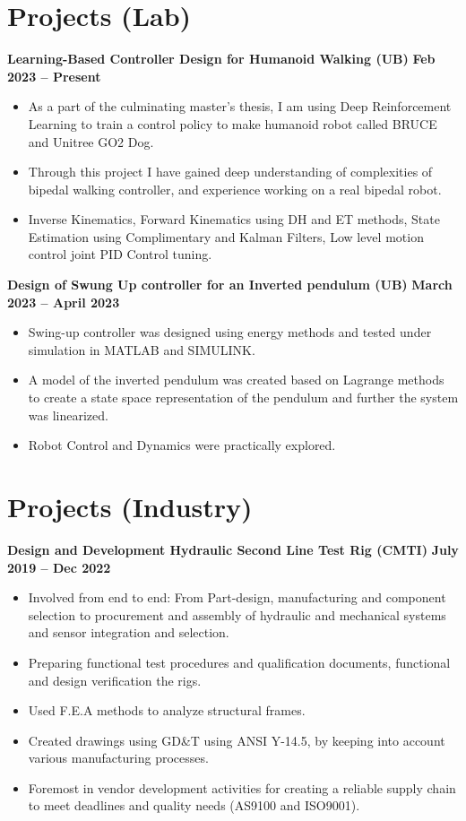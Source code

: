 \documentclass[10pt, letterpaper]{article}
\begin{document}
\section{Projects (Lab)}
\textbf{Learning-Based Controller Design for Humanoid Walking (UB) } \hfill \textbf{Feb 2023 – Present}\\
\begin{itemize}
    \item As a part of the culminating master’s thesis, I am using Deep Reinforcement Learning to train a control policy to make humanoid robot called BRUCE and Unitree GO2 Dog.
    \item Through this project I have gained deep understanding of complexities of bipedal walking controller, and experience working on a real bipedal robot.
    \item Inverse Kinematics, Forward Kinematics using DH and ET methods, State Estimation using Complimentary and Kalman Filters, Low level motion control joint PID Control tuning. 
\end{itemize}

\textbf{Design of Swung Up controller for an Inverted pendulum (UB)}  \hfill \textbf{March 2023 – April 2023}\\
\begin{itemize}
    \item Swing-up controller was designed using energy methods and tested under simulation in MATLAB and SIMULINK.
    \item A model of the inverted pendulum was created based on Lagrange methods to create a state space representation of the pendulum and further the system was linearized.
    \item Robot Control and Dynamics were practically explored.
\end{itemize}

\section{Projects (Industry)}

\textbf{Design and Development Hydraulic Second Line Test Rig (CMTI)}  \hfill \textbf{July 2019 – Dec 2022}\\
\begin{itemize}
    \item Involved from end to end: From Part-design, manufacturing and component selection to procurement and assembly of hydraulic and mechanical systems and sensor integration and selection.
    \item Preparing functional test procedures and qualification documents, functional and design verification the rigs.
    \item Used F.E.A methods to analyze structural frames.
    \item Created drawings using GD\&T using ANSI Y-14.5, by keeping into account various manufacturing processes.
    \item Foremost  in vendor development activities for creating a reliable supply chain to meet deadlines and quality needs (AS9100 and ISO9001).
\end{itemize}
\end{document}
